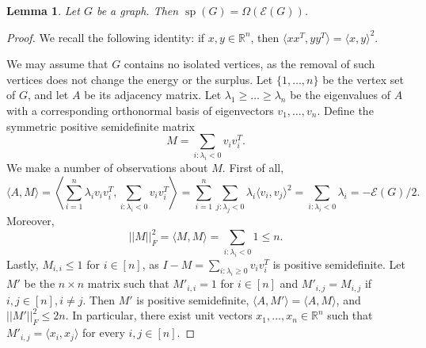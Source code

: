 \documentclass[11pt]{amsart}
\theoremstyle{plain}
\newtheorem{lemma}[theorem]{Lemma}
\theoremstyle{definition}
\DeclareMathOperator{\surp}{sp}
\begin{document}
\begin{lemma}\label{lemma:surplus_energy}
Let $G$ be a graph. Then $\surp(G)=\Omega(\mathcal{E}(G))$.
\end{lemma}

\begin{proof}
We recall the following identity: if $x,y\in \mathbb{R}^n$, then $\langle xx^T,yy^T\rangle=\langle x,y\rangle^2$.

We may assume that $G$ contains no isolated vertices, as the removal of such vertices does not change the energy or the surplus. Let $\{1,\dots,n\}$ be the vertex set of $G$, and let $A$ be its adjacency matrix. Let $\lambda_1\geq \dots\geq \lambda_n$ be the eigenvalues of $A$ with a corresponding orthonormal basis of eigenvectors $v_1,\dots,v_n$. Define the symmetric positive semidefinite matrix
$$M=\sum_{i: \lambda_i<0} v_iv_i^T.$$
We make a number of observations about $M$. First of all, 
$$\langle A,M\rangle=\left\langle \sum_{i=1}^n \lambda_i v_iv_i^T,\sum_{i:\lambda_i<0}v_iv_i^T\right\rangle=\sum_{i=1}^n\sum_{j:\lambda_j<0}\lambda_i\langle v_i,v_j\rangle^2=\sum_{i:\lambda_i<0}\lambda_i=-\mathcal{E}(G)/2.$$
Moreover, 
$$||M||_F^2=\langle M,M\rangle=\sum_{i:\lambda_i<0}1\leq n.$$
Lastly, $M_{i,i}\leq 1$ for $i\in [n]$, as $I-M=\sum_{i:\lambda_i\geq 0}v_iv_i^T$ is positive semidefinite. Let $M'$ be the $n\times n$ matrix such that $M'_{i,i}=1$ for $i\in [n]$ and $M'_{i,j}=M_{i,j}$ if $i,j\in [n],i\neq j$. Then $M'$ is positive semidefinite, $\langle A,M'\rangle=\langle A,M\rangle$, and $||M'||_F^2\leq 2n$. In particular, there exist unit vectors $x_1,\dots,x_n\in\mathbb{R}^n$ such that $M'_{i,j}=\langle x_i,x_j\rangle$ for every $i,j\in [n]$.


\end{proof}
\end{document}
